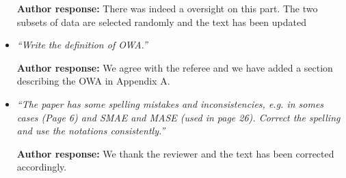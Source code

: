 \documentclass[11pt]{article}
\begin{document}
\begin{itemize}
\textbf{Author response:} There was indeed a oversight on this part. The two subsets of data are selected randomly and the text has been updated

\item {\em ``Write the definition of OWA.''} \medskip

\textbf{Author response:} We agree with the referee and we have added a section describing the OWA in Appendix A.

\item {\em ``The paper has some spelling mistakes and inconsistencies, e.g. in somes cases (Page 6) and SMAE and MASE (used in page 26). Correct the spelling and use the notations consistently.''} \medskip

\textbf{Author response:} We thank the reviewer and the text has been corrected accordingly.
\end{itemize}
\end{document}
